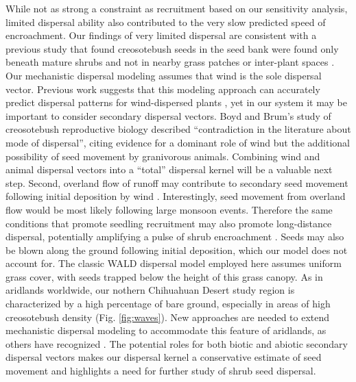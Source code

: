 \documentclass[11pt]{article}\usepackage[]{graphicx}\usepackage[]{color}
\begin{document}
While not as strong a constraint as recruitment based on our sensitivity analysis, limited dispersal ability also contributed to the very slow predicted speed of encroachment. 
Our findings of very limited dispersal are consistent with a previous study that found creosotebush seeds in the seed bank were found only beneath mature shrubs and not in nearby grass patches or inter-plant spaces \citep{moreno2016seed}. 
Our mechanistic dispersal modeling assumes that wind is the sole dispersal vector. 
Previous work suggests that this modeling approach can accurately predict dispersal patterns for wind-dispersed plants \citep{skarpaas2007dispersal}, yet in our system it may be important to consider secondary dispersal vectors. 
Boyd and Brum's \citeyear{boyd1983postdispersal} study of creosotebush reproductive biology described ``contradiction in the literature about mode of dispersal'', citing evidence for a dominant role of wind but the additional possibility of seed movement by granivorous animals. 
Combining wind and animal dispersal vectors into a ``total'' dispersal kernel \citep{rogers2019total} will be a valuable next step. 
Second, overland flow of runoff may contribute to secondary seed movement following initial deposition by wind \citep{thompson2014secondary}. 
Interestingly, seed movement from overland flow would be most likely following large monsoon events. 
Therefore the same conditions that promote seedling recruitment may also promote long-distance dispersal, potentially amplifying a pulse of shrub encroachment \citep{ellner2012temporally}. 
Seeds may also be blown along the ground following initial deposition, which our model does not account for.
The classic WALD dispersal model employed here assumes uniform grass cover, with seeds trapped below the height of this grass canopy. 
As in aridlands worldwide, our nothern Chihuahuan Desert study region is characterized by a high percentage of bare ground, especially in areas of high creosotebush density (Fig. \ref{fig:waves}). 
New approaches are needed to extend mechanistic dispersal modeling to accommodate this feature of aridlands, as others have recognized \citep{thompson2014secondary}. 
The potential roles for both biotic and abiotic secondary dispersal vectors makes our dispersal kernel a conservative estimate of seed movement and highlights a need for further study of shrub seed dispersal. 
\end{document}
